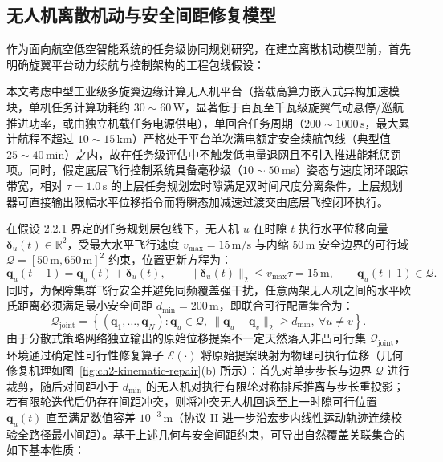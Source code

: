\subsection{无人机离散机动与安全间距修复模型}
\label{sec:ch2-swarm-kinematics}

作为面向航空低空智能系统的任务级协同规划研究，在建立离散机动模型前，首先明确旋翼平台动力续航与控制架构的工程包线假设：

\begin{assumption}[旋翼平台额定续航窗口与高低层控制时间尺度分离假设]
本文考虑中型工业级多旋翼边缘计算无人机平台（搭载高算力嵌入式异构加速模块，单机任务计算功耗约 $30\sim 60\,\mathrm{W}$，显著低于百瓦至千瓦级旋翼气动悬停/巡航推进功率，或由独立机载任务电源供电），单回合任务周期（$200\sim 1000\,\mathrm{s}$，最大累计航程不超过 $10\sim 15\,\mathrm{km}$）严格处于平台单次满电额定安全续航包线（典型值 $25\sim 40\,\mathrm{min}$）之内，故在任务级评估中不触发低电量退网且不引入推进能耗惩罚项。同时，假定底层飞行控制系统具备毫秒级（$10\sim 50\,\mathrm{ms}$）姿态与速度闭环跟踪带宽，相对 $\tau=1.0\,\mathrm{s}$ 的上层任务规划宏时隙满足双时间尺度分离条件，上层规划器可直接输出限幅水平位移指令而将瞬态加减速过渡交由底层飞控闭环执行。
\end{assumption}

在假设 2.2.1 界定的任务规划层包线下，无人机 $u$ 在时隙 $t$ 执行水平位移向量 $\boldsymbol{\delta}_u(t)\in\mathbb{R}^2$，受最大水平飞行速度 $v_{\max}=15\,\mathrm{m/s}$ 与内缩 $50\,\mathrm{m}$ 安全边界的可行域 $\mathcal{Q}=[50\,\mathrm{m},650\,\mathrm{m}]^2$ 约束，位置更新方程为：
\begin{equation}
    \mathbf q_u(t+1)=\mathbf q_u(t)+\boldsymbol\delta_u(t),\qquad
    \|\boldsymbol\delta_u(t)\|_2\leq v_{\max}\tau=15\,\mathrm{m},\qquad
    \mathbf q_u(t+1)\in\mathcal Q.
    \label{eq:ch2-swarm-motion}
\end{equation}
同时，为保障集群飞行安全并避免同频覆盖强干扰，任意两架无人机之间的水平欧氏距离必须满足最小安全间距 $d_{\min}=200\,\mathrm{m}$，即联合可行配置集合为：
\begin{equation}
    \mathcal Q_{\mathrm{joint}}=
    \left\{(\mathbf q_1,\ldots,\mathbf q_N):\mathbf q_u\in\mathcal Q,
    \ \|\mathbf q_u-\mathbf q_v\|_2\geq d_{\min},\ \forall u\neq v\right\}.
    \label{eq:ch2-joint-geometry}
\end{equation}
由于分散式策略网络独立输出的原始位移提案不一定天然落入非凸可行集 $\mathcal{Q}_{\mathrm{joint}}$，环境通过确定性可行性修复算子 $\mathcal{E}(\cdot)$ 将原始提案映射为物理可执行位移（几何修复机理如图~\ref{fig:ch2-kinematic-repair}(b) 所示）：首先对单步步长与边界 $\mathcal{Q}$ 进行裁剪，随后对间距小于 $d_{\min}$ 的无人机对执行有限轮对称排斥推离与步长重投影；若有限轮迭代后仍存在间距冲突，则将冲突无人机回退至上一时隙可行位置 $\mathbf{q}_u(t)$ 直至满足数值容差 $10^{-3}\,\mathrm{m}$（协议 II 进一步沿宏步内线性运动轨迹连续校验全路径最小间距）。基于上述几何与安全间距约束，可导出自然覆盖关联集合的如下基本性质：

